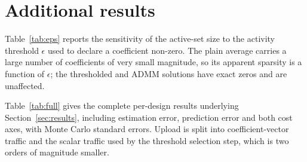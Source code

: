 \section{Additional results}
\label{app:extra}

Table~\ref{tab:eps} reports the sensitivity of the active-set size to the
activity threshold $\epsilon$ used to declare a coefficient non-zero. The
plain average carries a large number of coefficients of very small
magnitude, so its apparent sparsity is a function of $\epsilon$; the
thresholded and ADMM solutions have exact zeros and are unaffected.



Table~\ref{tab:full} gives the complete per-design results underlying
Section~\ref{sec:results}, including estimation error, prediction error and
both cost axes, with Monte Carlo standard errors. Upload is split into
coefficient-vector traffic and the scalar traffic used by the threshold
selection step, which is two orders of magnitude smaller.


